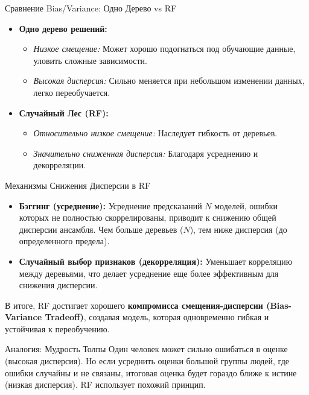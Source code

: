\begin{myblock}{Сравнение Bias/Variance: Одно Дерево vs RF}
    \begin{itemize}[nosep, leftmargin=*]
        \item \textbf{Одно дерево решений:}
            \begin{itemize}[label=\textbullet, nosep, leftmargin=*]
                \item \textit{Низкое смещение:} Может хорошо подогнаться под обучающие данные, уловить сложные зависимости.
                \item \textit{Высокая дисперсия:} Сильно меняется при небольшом изменении данных, легко переобучается.
            \end{itemize}
        \item \textbf{Случайный Лес (RF):}
            \begin{itemize}[label=\textbullet, nosep, leftmargin=*]
                \item \textit{Относительно низкое смещение:} Наследует гибкость от деревьев.
                \item \textit{Значительно сниженная дисперсия:} Благодаря усреднению и декорреляции.
            \end{itemize}
    \end{itemize}
\end{myblock}

\begin{textbox}{Механизмы Снижения Дисперсии в RF}
    \begin{itemize}[nosep, leftmargin=*]
        \item \textbf{Бэггинг (усреднение):} Усреднение предсказаний \(N\) моделей, ошибки которых не полностью скоррелированы, приводит к снижению общей дисперсии ансамбля. Чем больше деревьев (\(N\)), тем ниже дисперсия (до определенного предела).
        \item \textbf{Случайный выбор признаков (декорреляция):} Уменьшает корреляцию между деревьями, что делает усреднение еще более эффективным для снижения дисперсии.
    \end{itemize}
    В итоге, RF достигает хорошего \textbf{компромисса смещения-дисперсии (Bias-Variance Tradeoff)}, создавая модель, которая одновременно гибкая и устойчивая к переобучению.
\end{textbox}

\begin{myexampleblock}{Аналогия: Мудрость Толпы}
    Один человек может сильно ошибаться в оценке (высокая дисперсия). Но если усреднить оценки большой группы людей, где ошибки случайны и не связаны, итоговая оценка будет гораздо ближе к истине (низкая дисперсия). RF использует похожий принцип.
\end{myexampleblock}

